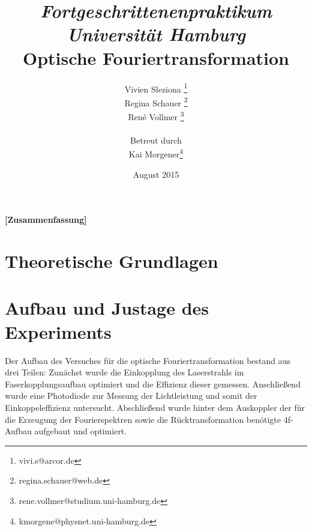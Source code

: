 \documentclass[12pt,a4paper]{article}
\begin{document}
	
	
	
	\title{\textit{Fortgeschrittenenpraktikum \\ Universität Hamburg}\\\textbf{Optische Fouriertransformation} }
	\date{August 2015}
	\author{Vivien Sleziona \footnote{vivi.s@arcor.de}\\ Regina Schauer \footnote{regina.schauer@web.de}\\ René Vollmer \footnote{rene.vollmer@studium.uni-hamburg.de} \\ \\Betreut durch\\ Kai Morgener\footnote{kmorgene@physnet.uni-hamburg.de}}
	
	\maketitle
	
	\begin{center} 
		\bigskip
		\bigskip
		
		\begin{minipage}{0.75\textwidth}
			\textbf{[Zusammenfassung]}
			
		\end{minipage}
	\end{center}
	
	\newpage
	
	\tableofcontents
	\vfill
	\newpage
	\clearpage	
	
	
	\section{Theoretische Grundlagen}
	

	
	\newpage
	\clearpage
	\section{Aufbau und Justage des Experiments}
	Der Aufbau des Versuches für die optische Fouriertransformation bestand aus drei Teilen: Zunächst wurde die Einkopplung des Laserstrahls im Faserkopplungsaufbau optimiert und die Effizienz dieser gemessen. Anschließend wurde eine Photodiode zur Messung der Lichtleistung und somit der Einkoppeleffizienz untersucht. Abschließend wurde hinter dem Auskoppler der für die Erzeugung der Fourierspektren sowie die Rücktransformation benötigte 4f-Aufbau aufgebaut und optimiert.
	
\end{document}
